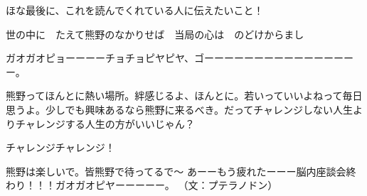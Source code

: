 \begin{multicols}{2}
ほな最後に、これを読んでくれている人に伝えたいこと！

世の中に　たえて熊野のなかりせば　当局の心は　のどけからまし

ガオガオピョーーーーチョチョピヤピヤ、ゴーーーーーーーーーーーーーーーー。

熊野ってほんとに熱い場所。絆感じるよ、ほんとに。若いっていいよねって毎日思うよ。少しでも興味あるなら熊野に来るべき。だってチャレンジしない人生よりチャレンジする人生の方がいいじゃん？

チャレンジチャレンジ！

熊野は楽しいで。皆熊野で待ってるで～
\newline
\newline
あーーもう疲れたーーー脳内座談会終わり！！！ガオガオピヤーーーーー。
\newline（文：プテラノドン）

\end{multicols}